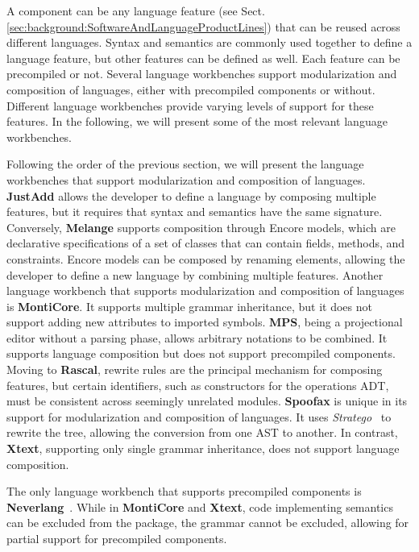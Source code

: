 A component can be any language feature (see Sect.\ref{sec:background:SoftwareAndLanguageProductLines}) that can be reused across different languages. Syntax and semantics are commonly used together to define a language feature, but other features can be defined as well. Each feature can be precompiled\cite{Cazzola13e} or not. Several language workbenches support modularization and composition of languages, either with precompiled components or without. Different language workbenches provide varying levels of support for these features. In the following, we will present some of the most relevant language workbenches.

Following the order of the previous section, we will present the language workbenches that support modularization and composition of languages. \textbf{JustAdd} allows the developer to define a language by composing multiple features, but it requires that syntax and semantics have the same signature. Conversely, \textbf{Melange} supports composition through Encore models, which are declarative specifications of a set of classes that can contain fields, methods, and constraints. Encore models can be composed by renaming elements, allowing the developer to define a new language by combining multiple features. Another language workbench that supports modularization and composition of languages is \textbf{MontiCore}. It supports multiple grammar inheritance, but it does not support adding new attributes to imported symbols. \textbf{MPS}, being a projectional editor without a parsing phase, allows arbitrary notations to be combined. It supports language composition but does not support precompiled components. Moving to \textbf{Rascal}, rewrite rules are the principal mechanism for composing features, but certain identifiers, such as constructors for the operations ADT, must be consistent across seemingly unrelated modules. \textbf{Spoofax} is unique in its support for modularization and composition of languages. It uses \textit{Stratego}~\cite{Bravenboer08} to rewrite the tree, allowing the conversion from one AST to another. In contrast, \textbf{Xtext}, supporting only single grammar inheritance, does not support language composition.

The only language workbench that supports precompiled components is \textbf{Neverlang}~\cite{Cazzola13e}. While in \textbf{MontiCore} and \textbf{Xtext}, code implementing semantics can be excluded from the package, the grammar cannot be excluded, allowing for partial support for precompiled components.

